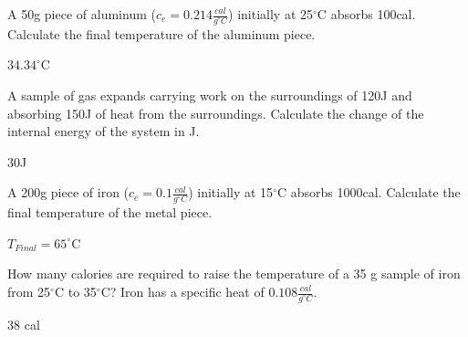 \documentclass[main.tex]{subfiles}
\begin{document}
\begin{multicols*}{2}
\begin{question}[ID=\the\value{numA}]
A 50g piece of aluminum ($c_e=0.214\frac{cal}{g^{\circ}C}$) initially at 25$^{\circ}$C absorbs 100cal. Calculate the final temperature of the aluminum piece.
\end{question}
\begin{solution}
$34.34^{\circ}$C
 \hspace{0.1cm}\end{solution}

\begin{question}[ID=\the\value{numA}]
A sample of gas expands carrying work on the surroundings of 120J and absorbing 150J of heat from the surroundings. Calculate the change of the internal energy of the system in J.
\end{question}
\begin{solution}
30J
 \hspace{0.1cm}\end{solution}



\begin{question}[ID=\the\value{numA}]
A 200g piece of iron ($c_e=0.1\frac{cal}{g^{\circ}C}$) initially at 15$^{\circ}$C absorbs 1000cal. Calculate the final temperature of the metal piece.
\end{question}
\begin{solution}
$T_{Final}=65^{\circ}$C
 \hspace{0.1cm}\end{solution}

\begin{question}[ID=\the\value{numA}]
How many calories are required to raise the temperature of a 35 g sample of iron from 25$^{\circ}$C to 35$^{\circ}$C?  Iron has a specific heat of $0.108\frac{cal}{g^{\circ}C}$.
\end{question}
\begin{solution}
38 cal
 \hspace{0.1cm}\end{solution}


\end{multicols*}
\end{document}

